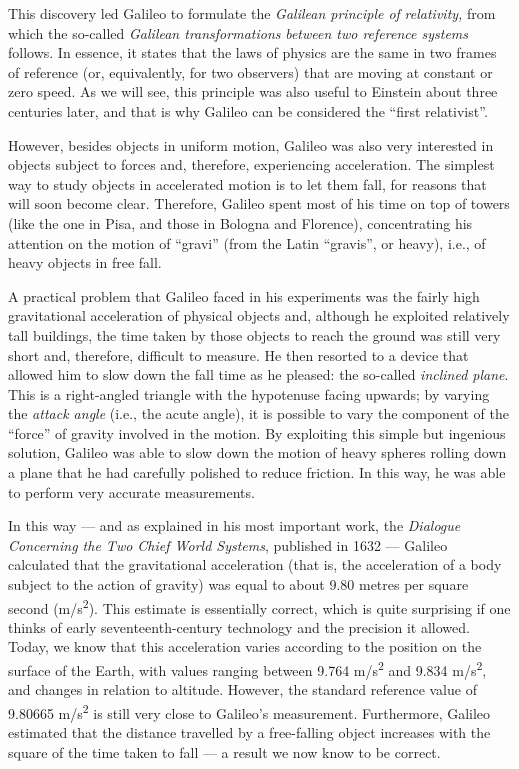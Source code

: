 This discovery led Galileo to formulate the \emph{Galilean principle
of} \emph{relativity,} from which the so-called
\emph{Galilean transformations} \emph{between two
reference systems} follows. In essence, it states that the laws of physics are the same
in two frames of reference (or, equivalently, for two observers) that are moving at
constant or zero speed. As we will see, this principle was also useful to Einstein about
three centuries later, and that is why Galileo can be considered the ``first
relativist''.

However, besides objects in uniform motion, Galileo was also very interested in objects
subject to forces and, therefore, experiencing acceleration. The simplest way to study
objects in accelerated motion is to let them fall, for reasons that will soon become
clear. Therefore, Galileo spent most of his time on top of towers (like the one in Pisa,
and those in Bologna and Florence), concentrating his attention on the motion of
``gravi'' (from the Latin ``gravis'', or heavy), i.e., of
heavy objects in free fall.

A practical problem that Galileo faced in his experiments was the fairly high
gravitational acceleration of physical objects and, although he exploited relatively
tall buildings, the time taken by those objects to reach the ground was still very short
and, therefore, difficult to measure. He then resorted to a device that allowed him to
slow down the fall time as he pleased: the so-called \emph{inclined plane}. This is a
right-angled triangle with the hypotenuse facing upwards; by varying the \emph{attack
angle} (i.e., the acute angle), it is possible to vary the component of the ``force'' of
gravity involved in the motion. By exploiting this simple but
ingenious solution, Galileo was able to slow down the motion of heavy spheres rolling
down a plane that he had carefully polished to reduce friction. In this way, he was able
to perform very accurate measurements.

In this way --- and as explained in his most important work, the \emph{Dialogue
Concerning the Two Chief World Systems}, published in 1632 --- Galileo calculated that
the gravitational acceleration (that is, the acceleration of a body subject to the
action of gravity) was equal to about 9.80 metres per square second
(m/s\textsuperscript{2}). This estimate is essentially correct, which is quite
surprising if one thinks of early seventeenth-century technology and the precision it
allowed. Today, we know that this acceleration varies according to the position on the
surface of the Earth, with values ranging between 9.764 m/s\textsuperscript{2} and 9.834
m/s\textsuperscript{2}, and changes in relation to altitude. However, the standard
reference value of 9.80665 m/s\textsuperscript{2} is still very close to Galileo's
measurement. Furthermore, Galileo estimated that the distance travelled by a
free-falling object increases with the square of the time taken to fall --- a result we
now know to be correct.

